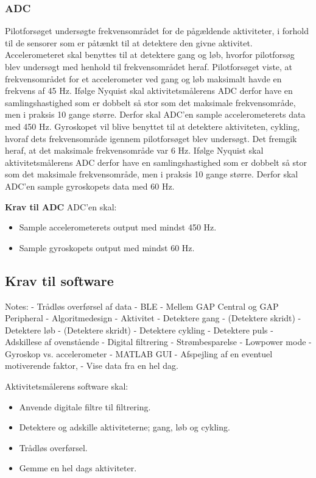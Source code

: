 \subsubsection{ADC}
Pilotforsøget undersøgte frekvensområdet for de pågældende aktiviteter, i forhold til de sensorer som er påtænkt til at detektere den givne aktivitet.\newline
Accelerometeret skal benyttes til at detektere gang og løb, hvorfor pilotforsøg blev undersøgt med henhold til frekvensområdet heraf. Pilotforsøget viste, at frekvensområdet for et accelerometer ved gang og løb maksimalt havde en frekvens af 45 Hz. Ifølge Nyquist skal aktivitetsmålerens ADC derfor have en samlingshastighed som er dobbelt så stor som det maksimale frekvensområde, men i praksis 10 gange større. Derfor skal ADC'en sample accelerometerets data med 450 Hz.\newline
Gyroskopet vil blive benyttet til at detektere aktiviteten, cykling, hvoraf dets frekvensområde igennem pilotforsøget blev undersøgt. Det fremgik heraf, at det maksimale frekvensområde var 6 Hz. Ifølge Nyquist skal aktivitetsmålerens ADC derfor have en samlingshastighed som er dobbelt så stor som det maksimale frekvensområde, men i praksis 10 gange større. Derfor skal ADC'en sample gyroskopets data med 60 Hz.

\textbf{Krav til ADC} \newline
ADC'en skal:
\begin{itemize}
\item Sample accelerometerets output med mindst 450 Hz.
\item Sample gyroskopets output med mindst 60 Hz. 
\end{itemize}



\subsection{Krav til software}

Notes: 
- Trådløs overførsel af data
	- BLE
	- Mellem GAP Central og GAP Peripheral
- Algoritmedesign 
	- Aktivitet
		- Detektere gang 
			- (Detektere skridt)
		- Detektere løb
			- (Detektere skridt)
		- Detektere cykling
		- Detektere puls 
		- Adskillese af ovenstående
		- Digital filtrering 
	- Strømbesparelse 
		- Lowpower mode
		- Gyroskop vs. accelerometer
- MATLAB GUI
	- Afspejling af en eventuel motiverende faktor, 
	- Vise data fra en hel dag. 
		

Aktivitetsmålerens software skal:
\begin{itemize}
\item Anvende digitale filtre til filtrering.
\item Detektere og adskille aktiviteterne; gang, løb og cykling. 
\item Trådløs overførsel.
\item Gemme en hel dags aktiviteter. 
\end{itemize}
